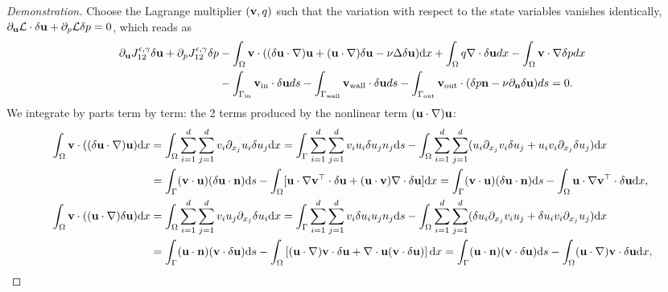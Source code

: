 \documentclass[oneside,11pt]{book}
\numberwithin{equation}{section}
\begin{document}
\begin{proof}[Demonstration]
    Choose the Lagrange multiplier $({\bf v},q)$ such that the variation with respect to the state variables vanishes identically, $\partial_{\bf u}\mathcal{L}\cdot\delta{\bf u} + \partial_p\mathcal{L}\delta p = 0$, which reads as
    \begin{align}
        \partial_{\bf u}J_{12}^{\epsilon,\gamma}\delta{\bf u} + \partial_pJ_{12}^{\epsilon,\gamma}\delta p &- \int_\Omega {\bf v}\cdot((\delta{\bf u}\cdot\nabla){\bf u} + ({\bf u}\cdot\nabla)\delta{\bf u} - \nu\Delta\delta{\bf u}){\rm d}x + \int_\Omega q\nabla\cdot\delta{\bf u}dx - \int_\Omega {\bf v}\cdot\nabla\delta pdx \nonumber\\
        &- \int_{\Gamma_{\rm in}} {\bf v}_{\rm in}\cdot\delta{\bf u}ds - \int_{\Gamma_{\rm wall}} {\bf v}_{\rm wall}\cdot\delta{\bf u}ds - \int_{\Gamma_{\rm out}} {\bf v}_{\rm out}\cdot(\delta p{\bf n} - \nu\partial_{\bf n}\delta{\bf u})ds = 0.\label{1.4.2}
    \end{align}
    We integrate by parts term by term: the 2 terms produced by the nonlinear term $({\bf u}\cdot\nabla){\bf u}$:
    \begin{align}
        \int_\Omega {\bf v}\cdot((\delta{\bf u}\cdot\nabla){\bf u}){\rm d}x &= \int_\Omega \sum_{i=1}^d\sum_{j=1}^d v_i\partial_{x_j}u_i\delta u_j{\rm d}x = \int_\Gamma \sum_{i=1}^d\sum_{j=1}^d v_iu_i\delta u_jn_j{\rm d}s - \int_\Omega \sum_{i=1}^d\sum_{j=1}^d (u_i\partial_{x_j}v_i\delta u_j + u_iv_i\partial_{x_j}\delta u_j){\rm d}x\\
        &= \int_\Gamma ({\bf v}\cdot{\bf u})(\delta{\bf u}\cdot{\bf n}){\rm d}s - \int_\Omega [{\bf u}\cdot\nabla{\bf v}^\top\cdot\delta{\bf u} + ({\bf u}\cdot{\bf v})\nabla\cdot\delta{\bf u}]{\rm d}x = \int_\Gamma ({\bf v}\cdot{\bf u})(\delta{\bf u}\cdot{\bf n}){\rm d}s - \int_\Omega {\bf u}\cdot\nabla{\bf v}^\top\cdot\delta{\bf u}{\rm d}x,\\
        \int_\Omega {\bf v}\cdot(({\bf u}\cdot\nabla)\delta{\bf u}){\rm d}x &= \int_\Omega \sum_{i=1}^d\sum_{j=1}^d v_iu_j\partial_{x_j}\delta u_i{\rm d}x = \int_\Gamma \sum_{i=1}^d\sum_{j=1}^d v_i\delta u_iu_jn_j{\rm d}s - \int_\Omega \sum_{i=1}^d\sum_{j=1}^d (\delta u_i\partial_{x_j}v_iu_j + \delta u_iv_i\partial_{x_j}u_j){\rm d}x\\
        &= \int_\Gamma ({\bf u}\cdot{\bf n})({\bf v}\cdot\delta{\bf u}){\rm d}s - \int_\Omega \left[({\bf u}\cdot\nabla){\bf v}\cdot\delta{\bf u} + \nabla\cdot{\bf u}({\bf v}\cdot\delta{\bf u})\right]{\rm d}x = \int_\Gamma ({\bf u}\cdot{\bf n})({\bf v}\cdot\delta{\bf u}){\rm d}s - \int_\Omega ({\bf u}\cdot\nabla){\bf v}\cdot\delta{\bf u}{\rm d}x,

\end{align}
\end{proof}
\end{document}
